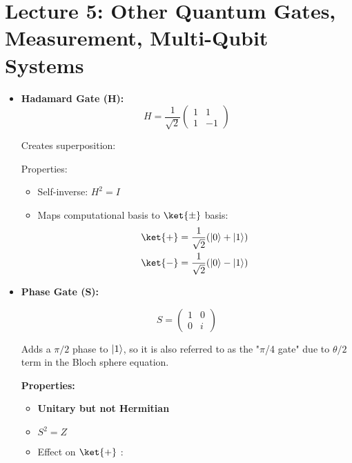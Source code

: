 \section{Lecture 5: Other Quantum Gates, Measurement, Multi-Qubit Systems}

\begin{itemize}
  \item \textbf{Hadamard Gate (H):}
    \[
      \boxed{
        H = \frac{1}{\sqrt{2}} \begin{pmatrix} 1 & 1 \\ 1 & -1 \end{pmatrix}
      }
    \]

    Creates superposition: 

    \vspace{0.3cm}

    Properties:

    \begin{itemize}
      \item Self-inverse: $H^2 = I$
      \item Maps computational basis to $\ket{\pm}$ basis:
        \begin{align*}
          \ket{+} &= \frac{1}{\sqrt{2}}(\zero + \one) \\
          \ket{-} &= \frac{1}{\sqrt{2}}(\zero - \one)
        \end{align*}
    \end{itemize}

    \aside{
      \[
        H \zero = \ket{+}, \quad H \one = \ket{-}, \quad H \ket{+} = \zero, \quad H \ket{-} = \one
      \]
    }

  \item \textbf{Phase Gate (S):}

    \[
      \boxed{
      S = \begin{pmatrix} 1 & 0 \\ 0 & i \end{pmatrix}
      }
    \]

    Adds a $\pi/2$ phase to $\left|1\right\rangle$, so it is also referred to as the "$\pi$/4 gate"
    due to $\theta/2$ term in the Bloch sphere equation.

    \vspace{0.3cm}

    \textbf{Properties:}

    \begin{itemize}
      \item \textbf{Unitary but not Hermitian}
      \item $S^2 = Z$
      \item Effect on $\ket{+}$ : 
    \end{itemize}


\end{itemize}
